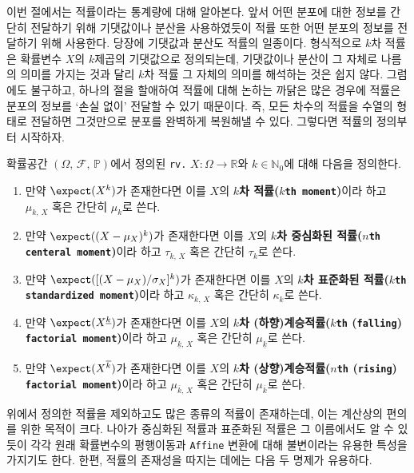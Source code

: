 이번 절에서는 적률이라는 통계량에 대해 알아본다. 앞서 어떤 분포에 대한 정보를 간단히 전달하기 위해 기댓값이나 분산을 사용하였듯이 적률 또한 어떤 분포의 정보를 전달하기 위해 사용한다. 당장에 기댓값과 분산도 적률의 일종이다. 형식적으로 $k$차 적률은 확률변수 $X$의 $k$제곱의 기댓값으로 정의되는데, 기댓값이나 분산이 그 자체로 나름의 의미를 가지는 것과 달리 $k$차 적률 그 자체의 의미를 해석하는 것은 쉽지 않다. 그럼에도 불구하고, 하나의 절을 할애하여 적률에 대해 논하는 까닭은 많은 경우에 적률은 분포의 정보를 `손실 없이' 전달할 수 있기 때문이다. 즉, 모든 차수의 적률을 수열의 형태로 전달하면 그것만으로 분포를 완벽하게 복원해낼 수 있다. 그렇다면 적률의 정의부터 시작하자.

\begin{definition}
    확률공간 $(\Omega,\,\mathcal{F},\,\mathbb{P})$에서 정의된 \texttt{rv.} $X:\Omega\to\mathbb{R}$와 $k\in\mathbb{N}_0$에 대해 다음을 정의한다.
    \begin{enumerate}
        \item 만약 $\expect(X^k)$가 존재한다면 이를 $X$의 \textbf{$k$차 적률($k$\texttt{th moment})}이라 하고 $\mu_{k,\,X}$ 혹은 간단히 $\mu_k$로 쓴다.
        \item 만약 $\expect((X-\mu_X)^k)$가 존재한다면 이를 $X$의 \textbf{$k$차 중심화된 적률($n$\texttt{th centeral moment})}이라 하고 $\tau_{k,\,X}$ 혹은 간단히 $\tau_k$로 쓴다.
        \item 만약 $\expect([(X-\mu_X)/\sigma_X]^k)$가 존재한다면 이를 $X$의 \textbf{$k$차 표준화된 적률($k$\texttt{th standardized moment})}이라 하고 $\kappa_{k,\,X}$ 혹은 간단히 $\kappa_k$로 쓴다.
        \item 만약 $\expect(X^{\underline{k}})$가 존재한다면 이를 $X$의 \textbf{$k$차 (하향)계승적률($k$\texttt{th} (\texttt{falling}) \texttt{factorial moment})}이라 하고 $\mu_{\underline{k},\,X}$ 혹은 간단히 $\mu_{\underline{k}}$로 쓴다.
        \item 만약 $\expect(X^{\overline{k}})$가 존재한다면 이를 $X$의 \textbf{$k$차 (상향)계승적률($n$\texttt{th} (\texttt{rising}) \texttt{factorial moment})}이라 하고 $\mu_{\overline{k},\,X}$ 혹은 간단히 $\mu_{\overline{k}}$로 쓴다.
    \end{enumerate}
\end{definition}

위에서 정의한 적률을 제외하고도 많은 종류의 적률이 존재하는데, 이는 계산상의 편의를 위한 목적이 크다. 나아가 중심화된 적률과 표준화된 적률은 그 이름에서도 알 수 있듯이 각각 원래 확률변수의 평행이동과 \texttt{Affine} 변환에 대해 불변이라는 유용한 특성을 가지기도 한다. 한편, 적률의 존재성을 따지는 데에는 다음 두 명제가 유용하다.

